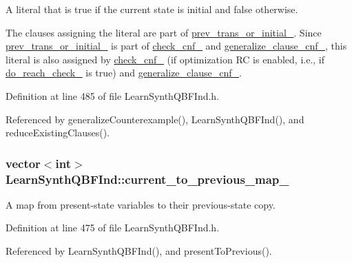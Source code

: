 A literal that is true if the current state is initial and false otherwise. 

The clauses assigning the literal are part of \hyperlink{classLearnSynthQBFInd_ad99eafb7ee9134115f9fbe986e5eb0c5}{prev\-\_\-trans\-\_\-or\-\_\-initial\-\_\-}. Since \hyperlink{classLearnSynthQBFInd_ad99eafb7ee9134115f9fbe986e5eb0c5}{prev\-\_\-trans\-\_\-or\-\_\-initial\-\_\-} is part of \hyperlink{classLearnSynthQBFInd_ac90a4574da82c96888db219291368554}{check\-\_\-cnf\-\_\-} and \hyperlink{classLearnSynthQBFInd_ad61b112cfcc60506f7b21c9ea9267b37}{generalize\-\_\-clause\-\_\-cnf\-\_\-}, this literal is also assigned by \hyperlink{classLearnSynthQBFInd_ac90a4574da82c96888db219291368554}{check\-\_\-cnf\-\_\-} (if optimization R\-C is enabled, i.\-e., if \hyperlink{classLearnSynthQBFInd_af87e4a2c1d17c4c5bc398082d6d3e365}{do\-\_\-reach\-\_\-check\-\_\-} is true) and \hyperlink{classLearnSynthQBFInd_ad61b112cfcc60506f7b21c9ea9267b37}{generalize\-\_\-clause\-\_\-cnf\-\_\-}. 

Definition at line 485 of file Learn\-Synth\-Q\-B\-F\-Ind.\-h.



Referenced by generalize\-Counterexample(), Learn\-Synth\-Q\-B\-F\-Ind(), and reduce\-Existing\-Clauses().

\hypertarget{classLearnSynthQBFInd_a8047ab13c44736c39c11f9c0b48e29cf}{
\subsubsection[{current\-\_\-to\-\_\-previous\-\_\-map\-\_\-}]{\setlength{\rightskip}{0pt plus 5cm}vector$<$int$>$ Learn\-Synth\-Q\-B\-F\-Ind\-::current\-\_\-to\-\_\-previous\-\_\-map\-\_\-\hspace{0.3cm}{\ttfamily [protected]}}}\label{classLearnSynthQBFInd_a8047ab13c44736c39c11f9c0b48e29cf}


A map from present-\/state variables to their previous-\/state copy. 



Definition at line 475 of file Learn\-Synth\-Q\-B\-F\-Ind.\-h.



Referenced by Learn\-Synth\-Q\-B\-F\-Ind(), and present\-To\-Previous().


